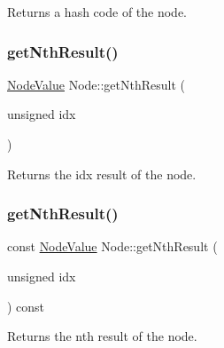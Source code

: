 \begin{DoxyReturn}{Returns}
a hash code of the node. 
\end{DoxyReturn}
\mbox{\label{classglow_1_1_node_a2bcdbc1727fd5ee405409168fe834f5f}} 
\subsubsection{\texorpdfstring{get\+Nth\+Result()}{getNthResult()}\hspace{0.1cm}{\footnotesize\ttfamily [1/2]}}
{\footnotesize\ttfamily \hyperlink{structglow_1_1_node_value}{Node\+Value} Node\+::get\+Nth\+Result (\begin{DoxyParamCaption}\item[{unsigned}]{idx }\end{DoxyParamCaption})}

\begin{DoxyReturn}{Returns}
the {\ttfamily idx} result of the node. 
\end{DoxyReturn}
\mbox{\label{classglow_1_1_node_aa570f3b0b2125e3b18b125d3c557f12b}} 
\subsubsection{\texorpdfstring{get\+Nth\+Result()}{getNthResult()}\hspace{0.1cm}{\footnotesize\ttfamily [2/2]}}
{\footnotesize\ttfamily const \hyperlink{structglow_1_1_node_value}{Node\+Value} Node\+::get\+Nth\+Result (\begin{DoxyParamCaption}\item[{unsigned}]{idx }\end{DoxyParamCaption}) const}

\begin{DoxyReturn}{Returns}
the n\textquotesingle{}th result of the node. 
\end{DoxyReturn}
\mbox{\label{classglow_1_1_node_ac3b7b40d0aaef77d50648124cf310bbb}} 
